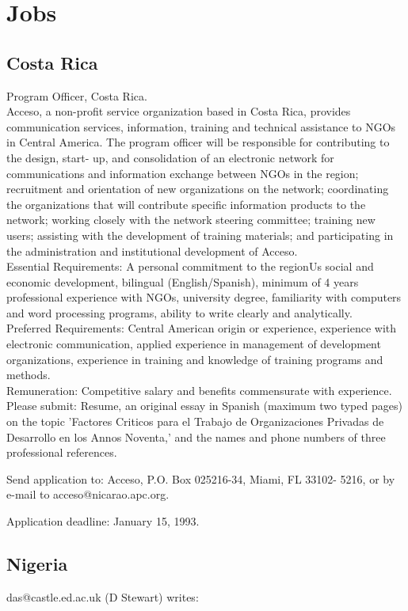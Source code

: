 \section{Jobs}
\subsection{Costa Rica}
 
Program Officer, Costa Rica.\\ 
Acceso, a non-profit service organization based in Costa Rica, 
provides communication services, information, training and 
technical assistance to NGOs in Central America.  The program 
officer will be responsible for contributing to the design, start-
up, and consolidation of an electronic network for communications 
and information exchange between NGOs in the region; recruitment 
and orientation of new organizations on the network; coordinating 
the organizations that will contribute specific information 
products to the network; working closely with the network steering 
committee; training new users; assisting with the development of 
training materials; and participating in the administration and 
institutional development of Acceso.  \\ 
Essential Requirements:  A personal commitment to the regionUs 
social and economic development, bilingual (English/Spanish), 
minimum of 4 years professional experience with NGOs, university 
degree, familiarity with computers and word processing programs, 
ability to write clearly and analytically.  \\ 
Preferred Requirements:  Central American origin or experience, 
experience with electronic communication, applied experience in 
management of development organizations, experience in training 
and knowledge of training programs and methods.\\ 
Remuneration:  Competitive salary and benefits commensurate with 
experience.\\ 
Please submit:  Resume, an original essay in Spanish (maximum two 
typed pages) on the topic 'Factores Criticos para el Trabajo de 
Organizaciones Privadas de Desarrollo en los Annos Noventa,' and 
the names and phone numbers of three professional references.  
 
Send application to:  Acceso, P.O. Box 025216-34, Miami, FL 33102-
5216, or by e-mail to acceso@nicarao.apc.org.
 
Application deadline:  January 15, 1993.
 
\subsection{Nigeria}
das@castle.ed.ac.uk (D Stewart) writes:

